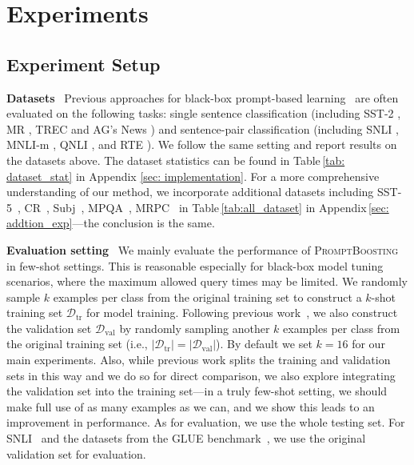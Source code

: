 \documentclass{article}
\theoremstyle{plain}
\theoremstyle{definition}
\theoremstyle{remark}
\newcommand{\alg}{\textsc{PromptBoosting}}
\begin{document}
\section{Experiments}
\subsection{Experiment Setup}
\label{subsec: setup}
\noindent \textbf{Datasets} \ 
Previous approaches for black-box prompt-based learning~\citep{sun2022bbt,sun2022bbtv2,deng2022rlprompt, zhang2022tempera} are often evaluated on the following tasks: single sentence classification (including SST-2 \citep{socher2013recursive}, MR \citep{pang2005seeing}, TREC \citep{voorhees2000building} and AG's News \citep{Zhang2015CharacterlevelCN}) and sentence-pair classification (including SNLI \citep{bowman2015large}, MNLI-m \citep{williams2018broad}, QNLI \citep{rajpurkar2016squad}, and RTE \citep{dagan2005pascal}). We follow the same setting and report results on the datasets above. The dataset statistics can be found in Table\,\ref{tab: dataset_stat} in Appendix \ref{sec: implementation}. 
For a more comprehensive understanding of our method, we incorporate additional datasets including SST-5~\citep{socher2013recursive},
CR~\citep{hu2004mining}, Subj~\citep{pang2004sentimental}, MPQA~\citep{wiebe2005annotating}, MRPC~\citep{dolan2005automatically} in Table\,\ref{tab:all_dataset} in Appendix\,\ref{sec: addtion_exp}---the conclusion is the same.

\noindent \textbf{Evaluation setting} \ 
We mainly evaluate the performance of {\alg} in few-shot settings. This is reasonable especially for black-box model tuning scenarios, where the maximum allowed query times may be limited.
We randomly sample $k$ examples per class from the original training set to construct a $k$-shot training set $\mathcal{D}_{\mathrm{tr}}$ for model training. 
Following previous work~\citep{gao2021making,zhang2021differentiable, sun2022bbt}, we also construct the validation set $\mathcal{D}_{\mathrm{val}}$ by randomly sampling another $k$ examples per class from the original training set (i.e., $|\mathcal{D}_{\mathrm{tr}}| = |\mathcal{D}_{\mathrm{val}}|$). By default we set $k = 16$ for our main experiments. 
Also, while previous work splits the training and validation sets in this way and we do so for direct comparison, we also explore integrating the validation set into the training set—in a truly few-shot setting, we should make full use of as many examples as we can, and we show this leads to an improvement in performance.
As for evaluation, we use the whole testing set. For SNLI~\citep{bowman2015large} and the datasets from the GLUE benchmark~\citep{wang2018glue}, we use the original validation set for evaluation.
\end{document}
